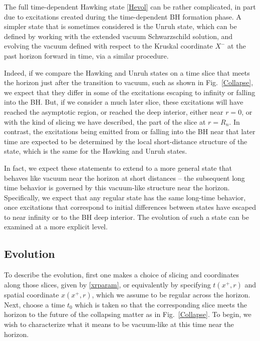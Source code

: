 \documentclass[12pt]{article}
\numberwithin{equation}{section}
\begin{document}
The full time-dependent Hawking state \eqref{Hevol} can be rather complicated, in  part due to excitations created during the time-dependent BH formation phase.  A simpler state that is sometimes considered is the Unruh state\cite{Unru}, which can be defined by working with the extended vacuum Schwarzschild solution, and evolving the vacuum defined with respect to the Kruskal coordinate $X^-$ at the past horizon forward in time, via a similar procedure.

Indeed, if we compare the Hawking and Unruh states on a time slice that meets the horizon just after the transition to vacuum, such as shown in Fig.~\ref{Collapse}, we expect that they differ in some of the excitations escaping to infinity or falling into the BH.  But, if we consider a much later slice, these excitations will have reached the asymptotic region, or reached the deep interior, either near $r=0$, or with the kind of slicing we have described, the part of the slice at $r=R_n$.
In contrast, the excitations being emitted from or falling into the BH near that later time are expected to be determined by the local short-distance structure of the state, which is the same for the Hawking and Unruh states.

In fact, we expect these statements to extend to a more general state that behaves like vacuum near the horizon at short distances -- the subsequent long time behavior is governed by this vacuum-like structure near the horizon.  Specifically, we expect that any regular state has the same long-time behavior, once excitations that correspond to initial differences between states have escaped to near infinity or to  the BH deep interior.  The evolution of such a state can be examined at a more explicit level.  

\subsection{Evolution}

 To describe the evolution, first one makes a choice of slicing and coordinates along those slices, given by \eqref{xrparam}, or equivalently by specifying $t(x^+,r)$ and spatial coordinate $x(x^+,r)$, which we assume to be regular across the horizon.  Next, choose a time $t_0$ which is taken so that the corresponding slice meets the horizon to the future of the collapsing matter as in Fig.~\ref{Collapse}.  To begin, we wish to characterize what it means to be vacuum-like at this time near the horizon.
 
\end{document}
